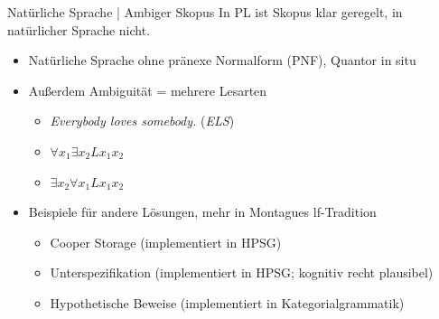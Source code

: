 \begin{frame}
  {Natürliche Sprache | Ambiger Skopus}
  \onslide<+->
  \onslide<+->
  In PL ist Skopus klar geregelt, in natürlicher Sprache nicht.\\
  \Halbzeile
  \begin{itemize}[<+->]
    \item Natürliche Sprache ohne \alert{pränexe Normalform} (PNF), Quantor in situ
    \item Außerdem \alert{Ambiguität = mehrere Lesarten}
      \begin{itemize}[<+->]
        \item \emph{Everybody loves somebody.} (\emph{ELS})
        \item $\forall{}x_1\exists{}x_2Lx_1x_2$
        \item $\exists{}x_2\forall{}x_1Lx_1x_2$
      \end{itemize}
      \Halbzeile
    \item Beispiele für andere Lösungen, mehr in Montagues lf-Tradition
      \begin{itemize}[<+->]
        \item \alert{Cooper Storage} (implementiert in HPSG)
        \item \alert{Unterspezifikation} (implementiert in HPSG; kognitiv recht plausibel)
        \item \alert{Hypothetische Beweise} (implementiert in Kategorialgrammatik)
      \end{itemize}
  \end{itemize}
\end{frame}


